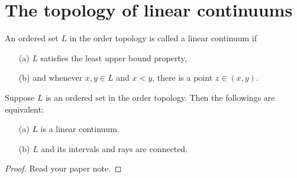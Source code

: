\section{The topology of linear continuums}

\begin{defi}
    An ordered set $L$ in the order topology is called a linear continuum if
    \begin{enumerate}
        \item[(a)] $L$ satisfies the least upper bound property,
        \item[(b)] and whenever $x, y\in L$ and $x<y$, there is a point $z\in (x, y)$.
    \end{enumerate}
\end{defi}
\begin{thm}
    Suppose $L$ is an ordered set in the order topology.
    Then the followings are equivalent:
    \begin{enumerate}
        \item[(a)] $L$ is a linear continuum.
        \item[(b)] $L$ and its intervals and rays are connected.
    \end{enumerate}
\end{thm}
\begin{proof}
    \color{red}Read your paper note.\color{black}
\end{proof}